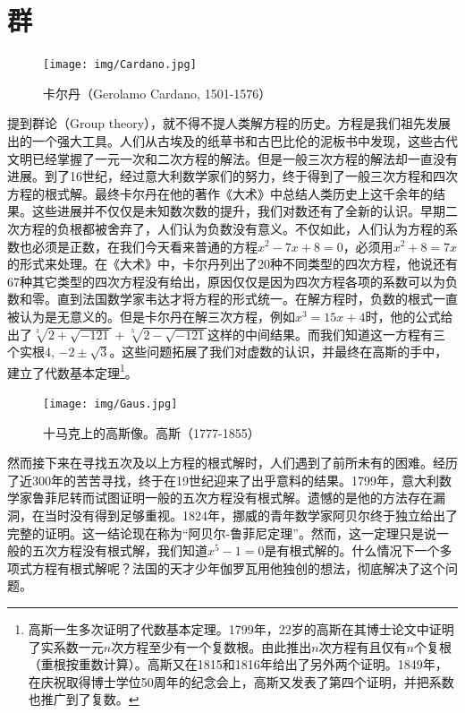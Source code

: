 \documentclass[b5paper]{ctexart}
\begin{document}
\section{群}

\begin{figure}[htbp]
 \centering
 \texttt{[image: img/Cardano.jpg]}
 \captionsetup{labelformat=empty}
 \caption{卡尔丹（Gerolamo Cardano, 1501-1576）}
 \label{fig:Cardano}
\end{figure}

提到群论（Group theory），就不得不提人类解方程的历史。方程是我们祖先发展出的一个强大工具。人们从古埃及的纸草书和古巴比伦的泥板书中发现，这些古代文明已经掌握了一元一次和二次方程的解法。但是一般三次方程的解法却一直没有进展。到了16世纪，经过意大利数学家们的努力，终于得到了一般三次方程和四次方程的根式解。最终卡尔丹在他的著作《大术》中总结人类历史上这千余年的结果。这些进展并不仅仅是未知数次数的提升，我们对数还有了全新的认识。早期二次方程的负根都被舍弃了，人们认为负数没有意义。不仅如此，人们认为方程的系数也必须是正数，在我们今天看来普通的方程$x^2 - 7x + 8 = 0$，必须用$x^2 + 8 = 7x$的形式来处理。在《大术》中，卡尔丹列出了20种不同类型的四次方程，他说还有67种其它类型的四次方程没有给出，原因仅仅是因为四次方程各项的系数可以为负数和零\cite{HanXueTao2012}。直到法国数学家韦达才将方程的形式统一。在解方程时，负数的根式一直被认为是无意义的。但是卡尔丹在解三次方程，例如$x^3 = 15x +4$时，他的公式给出了$\sqrt[3]{2 + \sqrt{-121}} + \sqrt[3]{2 - \sqrt{-121}}$这样的中间结果。而我们知道这一方程有三个实根4, $-2 \pm \sqrt{3}$。这些问题拓展了我们对虚数的认识，并最终在高斯的手中，建立了代数基本定理\footnote{高斯一生多次证明了代数基本定理。1799年，22岁的高斯在其博士论文中证明了实系数一元$n$次方程至少有一个复数根。由此推出$n$次方程有且仅有$n$个复根（重根按重数计算）。高斯又在1815和1816年给出了另外两个证明。1849年，在庆祝取得博士学位50周年的纪念会上，高斯又发表了第四个证明，并把系数也推广到了复数。}。

\begin{figure}[htbp]
 \centering
 \texttt{[image: img/Gaus.jpg]}
 \captionsetup{labelformat=empty}
 \caption{十马克上的高斯像。高斯（1777-1855）}
 \label{fig:Gauss}
\end{figure}

然而接下来在寻找五次及以上方程的根式解时，人们遇到了前所未有的困难。经历了近300年的苦苦寻找，终于在19世纪迎来了出乎意料的结果。1799年，意大利数学家鲁菲尼转而试图证明一般的五次方程没有根式解。遗憾的是他的方法存在漏洞，在当时没有得到足够重视。1824年，挪威的青年数学家阿贝尔终于独立给出了完整的证明。这一结论现在称为“阿贝尔-鲁菲尼定理”。然而，这一定理只是说一般的五次方程没有根式解，我们知道$x^5-1=0$是有根式解的。什么情况下一个多项式方程有根式解呢？法国的天才少年伽罗瓦用他独创的想法，彻底解决了这个问题\cite{Wiki-Galois-theory}。
\end{document}
